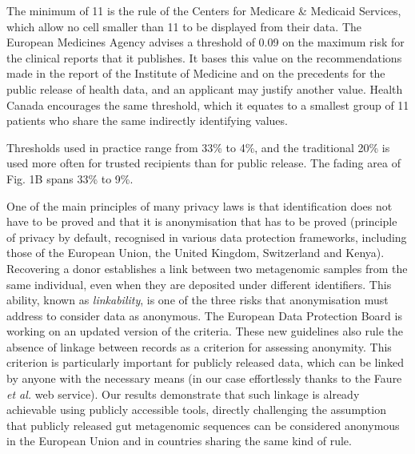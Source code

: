 \documentclass[11pt,a4paper]{article}
\begin{document}
The minimum of 11 is the rule of the Centers for Medicare \& Medicaid Services, which allow no cell smaller than 11 to be displayed from their data\cite{cms2020}. The European Medicines Agency advises a threshold of 0.09 on the maximum risk for the clinical reports that it publishes. It bases this value on the recommendations made in the report of the Institute of Medicine and on the precedents for the public release of health data, and an applicant may justify another value. Health Canada encourages the same threshold, which it equates to a smallest group of 11 patients who share the same indirectly identifying values\cite{healthcanada2019}.

Thresholds used in practice range from 33\% to 4\%, and the traditional 20\% is used more often for trusted recipients than for public release\cite{iom2015,elemam2011b,elemam2013}. The fading area of Fig. 1B spans 33\% to 9\%.

One of the main principles of many privacy laws is that identification does not have to be proved and that it is anonymisation that has to be proved (principle of privacy by default, recognised in various data protection frameworks, including those of the European Union, the United Kingdom, Switzerland and Kenya). Recovering a donor establishes a link between two metagenomic samples from the same individual, even when they are deposited under different identifiers. This ability, known as \textit{linkability}, is one of the three risks that anonymisation must address\cite{wp29} to consider data as anonymous. The European Data Protection Board is working on an updated version of the criteria. These new guidelines\cite{edpb2026} also rule the absence of linkage between records as a criterion for assessing anonymity. This criterion is particularly important for publicly released data, which can be linked by anyone with the necessary means (in our case effortlessly thanks to the Faure \textit{et al.} web service). Our results demonstrate that such linkage is already achievable using publicly accessible tools, directly challenging the assumption that publicly released gut metagenomic sequences can be considered anonymous in the European Union and in countries sharing the same kind of rule.

\clearpage

















\FloatBarrier


\end{document}
